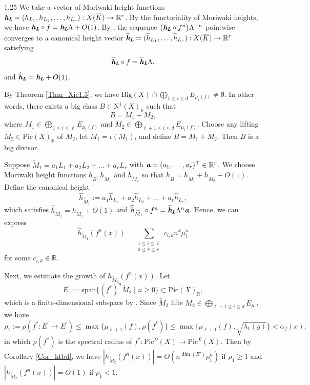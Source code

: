 \documentclass[12pt]{amsart}
\newcommand{\mb}[1]{\mathbb{#1}}
\newcommand{\mr}[1]{\mathrm{#1}}
\newcommand{\ov}{\overline}
\newcommand\ra{\rightarrow}
\newcommand\wt{\widetilde}
\newcommand\Pic{\mathrm{Pic\,}}
\newcommand{\mib}[1]{\textit{\textbf{#1}}}
\begin{document}
\begin{spacing}{1.25}
We take a vector of Moriwaki height functions $\mib{h}_{\mib{L}}=(h_{L_1},h_{L_2},\ldots, h_{L_r}): X(\ov{K})\ra\mb{R}^{r}$. By the functoriality of Moriwaki heights, we have $\mib{h}_{\mib{L}}\circ f=\mib{h}_{\mib{L}}\Lambda+O(1)$. By \cite[Theorem 5]{KS16}, the sequence $\big(\mib{h}_{\mib{L}}\circ f^n\big)\Lambda^{-n}$ pointwise converges to a canonical height vector $\widehat{\mib{h}}_{\mib{L}}=(\widehat{h}_{L_1},\ldots,\widehat{h}_{L_r}):X(\ov{K})\ra \mb{R}^{r}$ satisfying
\[\widehat{\mib{h}}_{\mib{L}}\circ f=\widehat{\mib{h}}_{\mib{L}}\Lambda,\]
and $\widehat{\mib{h}}_{\mib{L}}=\mib{h}_{\mib{L}}+O(1)$.

By Theorem \ref{Thm_Xie1.3}, we have $\mr{Big}(X)\cap \bigoplus\limits_{1\leq i\leq d}E_{\mu_i(f)}\neq \emptyset$. In other words, there exists a big class $B\in\mr{N}^1(X)_{\mb{R}}$ such that 
\[B=M_1+M_2,\]
where $M_1\in \bigoplus\limits_{1\leq i\leq \ell}E_{\mu_i(f)}$ and $M_2\in \bigoplus\limits_{\ell +1\leq i\leq d}E_{\mu_i(f)}$. Choose any lifting $\wt{M}_2\in \mr{Pic}(X)_{\mb{R}}$ of $M_2$, let $\wt{M}_1=\iota(M_1)$, and define $\wt{B}=\wt{M}_1+\wt{M}_2$. Then $\wt{B}$ is a big divisor. 


Suppose $\wt{M}_1=a_1L_1+a_2L_2+\dots+a_rL_r$ with $\mib{a} = (a_1, \ldots, a_r)^{\top} \in \mb{R}^r$. We choose Moriwaki height functions $h_{\wt{B}}, h_{\wt{M}_1}$ and $h_{\wt{M}_2}$ so that $h_{\wt{B}}=h_{\wt{M}_1}+h_{\wt{M}_2}+O(1)$. Define the canonical height \[\widehat{h}_{\wt{M}_1}:=a_1\widehat{h}_{L_1}+a_2\widehat{h}_{L_2}+\dots+a_r\widehat{h}_{L_r},\]
which satisfies $\widehat{h}_{\wt{M}_1}=h_{\wt{M}_1}+O(1)$ and  $\widehat{h}_{\wt{M}_1}\circ f^n=\widehat{\mib{h}}_{\mib{L}}\Lambda^n\mib{a}$. Hence, we can express
\[\widehat{h}_{\wt{M}_1}(f^n(x))=\sum_{\substack{1\leq i\leq \ell\\ 0\leq k\leq r}}c_{i,k}n^k\mu_i^{n}\]
for some $c_{i,k}\in \mb{R}$. 

Next, we estimate the growth of $h_{\wt{M}_2}(f^n(x))$. Let
\[E^{\prime}:=\mr{span}\{(f^*)^n \wt{M}_2\mid n\geq 0\}\subset \mr{Pic}(X)_{\mb{R}},\]
which is a finite-dimensional subspace by \cite[Lemma 19]{KS16}. Since $\wt{M}_2$ lifts $M_2\in \bigoplus\limits_{\ell +1\leq i\leq d}E_{\mu_i}$,  we have
\[\rho_1:=\rho(f^*:E^{\prime}\ra E^{\prime})\leq \max\{\mu_{\ell+1}(f),\rho(f^*)\}\leq \max\{\mu_{\ell+1}(f), \sqrt{\lambda_1(g)}\}<\alpha_f(x),\]
in which $\rho(f^*)$ is the spectral radius of $f^*:\Pic^0(X)\rightarrow\Pic^0(X)$. Then by Corollary \ref{Cor_htbd}, we have $|h_{\wt{M}_2}(f^n(x))|=O(n^{\dim(E')}\rho_1^n)$ if $\rho_1\geq1$ and $|h_{\wt{M}_2}(f^n(x))|=O(1)$ if $\rho_1<1$.


\end{spacing}
\end{document}
